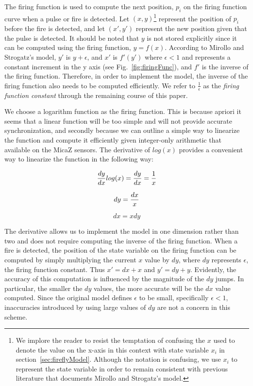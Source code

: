 The firing function is used to compute the next position, $p_i$ on the 
firing function curve when a pulse or fire is detected. 
Let $(x,y)$\footnote[1]{
We implore the reader to resist the temptation of confusing the $x$ used 
to denote the value on the x-axis in this
context with state variable $x_i$ in section~\ref{sec:fireflyModel}. Although
the notation is confusing, we use $x_i$ to represent the state variable
in order to remain consistent with previous literature that documents Mirollo and Strogatz's model.
}
represent the position of $p_i$ before the fire is detected, 
and let $(x',y')$ represent the new position given that the pulse is detected.
It should be noted that $y$ is not stored explicitly since it can be 
computed using the firing function, $y=f(x)$.
According to Mirollo and Strogatz's model, $y'$ is $y+\epsilon$,
and $x'$ is $f'(y')$ where $\epsilon < 1$ and represents a constant increment in the y axis 
(see Fig.~\ref{fig:firingFunc}), and $f'$ is the inverse of the firing function.
Therefore, in order to implement the model, the inverse of the firing 
function also needs to be computed efficiently.  
We refer to $\frac{1}{\epsilon}$ as the \emph{firing function constant} through
the remaining course of this paper. 

We choose a logarithm function as the firing function.  This is because
apriori it seems that a linear function will be too simple and will not provide
accurate synchronization, and secondly because we can outline a simple
way to linearize the function and compute it efficiently given integer-only
arithmetic that available on the MicaZ sensors. The derivative of $log(x)$ provides a convenient way to linearize
the function in the following way:

\begin{equation}
{dy \over dx}log(x) = {dy \over dx} = {1 \over x}
\end{equation}

\begin{equation}
dy = {dx \over x}
\end{equation}

\begin{equation}
dx = x dy
\end{equation}

The derivative allows us to implement the model in one dimension rather 
than two and does not require computing the inverse of the firing function. 
When a fire is detected, the position of the state variable on the
firing function can be computed by simply multiplying the current $x$ value 
by $dy$, where $dy$ represents $\epsilon$, the firing function constant.
Thus $x' = dx + x$ and $y' = dy + y$.
Evidently, the accuracy of this computation is influenced by the magnitude
of the $dy$ jumps.  In particular, the smaller the $dy$ values, the more accurate will
be the $dx$ value computed. Since the original model defines $\epsilon$ to be
small, specifically $\epsilon < 1$, inaccuracies introduced by using large values
of $dy$ are not a concern in this scheme.


